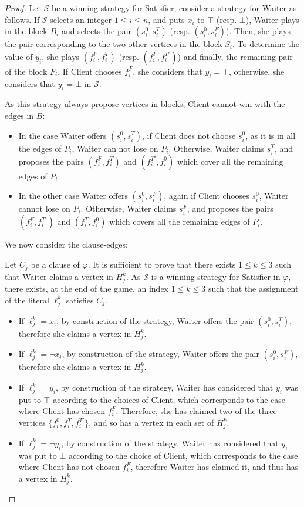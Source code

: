 \documentclass{article}
\newcommand{\strat}{\mathcal{S}}
\newcommand{\hedges}{edges\xspace}
\begin{document}
\begin{proof}
    Let $\strat$ be a winning strategy for Satisfier, consider a strategy for Waiter as follows. If $\strat$ selects an integer $1 \le i \le n$, and puts $x_i$ to $\top$ (resp. $\bot$), Waiter plays in the block \(B_i\) and selects the pair $(s_i^0, s_i^T)$ (resp. $(s_i^0, s_i^F)$). Then, she plays the pair corresponding to the two other vertices in the block $S_i$. To determine the value of $y_i$, she plays $(f_i^F,f_i^{T})$ (resp. $(f_i^F, f_i^{T'}) $) and finally, the remaining pair of the block $F_i$. If Client chooses $f_i^F$, she considers that $y_i = \top$, otherwise, she considers that $y_i = \bot$ in $\strat$.

As this strategy always propose vertices in blocks, Client cannot win with the \hedges in $B$:
\begin{itemize}
    \item In the case Waiter offers $(s_i^0, s_i^T)$, if Client does not choose $s_i^0$, as it is in all the \hedges of $P_i$, Waiter can not lose on $P_i$. Otherwise, Waiter claims $s_i^T$, and proposes the pairs $(f_i^F, f_i^T)$ and $(f_i^{T'}, f_i^0)$ which cover all the remaining \hedges of $P_i$. 
    \item In the other case Waiter offers $(s_i^0, s_i^F)$, again if Client chooses $s_i^0$, Waiter cannot lose on $P_i$. Otherwise, Waiter claims $s_i^F$, and proposes the pairs $(f_i^F, f_i^{T'})$ and $(f_i^T, f_i^0)$  which covers all the remaining \hedges of $P_i$. 
\end{itemize}

We now consider the clause-\hedges:

Let $C_j$ be a clause of $\varphi$. It is sufficient to prove that there exists $1 \le k \le 3$ such that Waiter claims a vertex in $H_j^k$. As $\strat$ is a winning strategy for Satisfier in $\varphi$, there exists, at the end of the game, an index \(1 \le k \le 3\) such that the assignment of the literal $\ell_j^k$ satisfies $C_j$. 

\begin{itemize}
    \item If $\ell_j^k = x_i$, by construction of the strategy, Waiter offers the pair $(s_i^0, s_i^T)$, therefore she claims a vertex in $H_j^k$.
    \item If $\ell_j^k = \neg x_i$, by construction of the strategy, Waiter offers the pair $(s_i^0, s_i^F)$, therefore she claims a vertex in $H_j^k$.
    \item If $\ell_j^k = y_i$, by construction of the strategy, Waiter has considered that $y_i$ was put to $\top$ according to the choices of Client, which corresponds to the case where Client has chosen $f_i^F$. Therefore, she has claimed two of the three vertices $\{f_i^0, f_i^T, f_i^{T'}\}$, and so has a vertex in each set of $H_j^k$. 
\item If $\ell_j^k = \neg y_i$, by construction of the strategy, Waiter has considered that $y_i$ was put to $\bot$ according to the choice of Client, which corresponds to the case where Client has not chosen $f_i^F$, therefore Waiter has claimed it, and thus has a vertex in $H_j^k$.
\end{itemize}


\end{proof}
\end{document}
